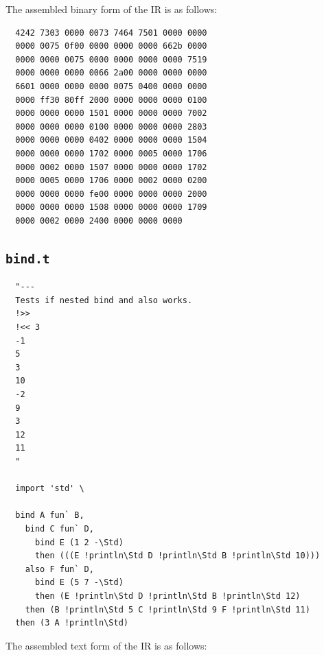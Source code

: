 \documentclass{report}
\begin{document}
The assembled binary form of the IR is as follows:

\begin{mdframed}[style=cl]
\begin{verbatim}
  4242 7303 0000 0073 7464 7501 0000 0000
  0000 0075 0f00 0000 0000 0000 662b 0000
  0000 0000 0075 0000 0000 0000 0000 7519
  0000 0000 0000 0066 2a00 0000 0000 0000
  6601 0000 0000 0000 0075 0400 0000 0000
  0000 ff30 80ff 2000 0000 0000 0000 0100
  0000 0000 0000 1501 0000 0000 0000 7002
  0000 0000 0000 0100 0000 0000 0000 2803
  0000 0000 0000 0402 0000 0000 0000 1504
  0000 0000 0000 1702 0000 0005 0000 1706
  0000 0002 0000 1507 0000 0000 0000 1702
  0000 0005 0000 1706 0000 0002 0000 0200
  0000 0000 0000 fe00 0000 0000 0000 2000
  0000 0000 0000 1508 0000 0000 0000 1709
  0000 0002 0000 2400 0000 0000 0000
\end{verbatim}
\end{mdframed}

\subsection{\texttt{bind.t}}

\begin{mdframed}[style=cl]
\begin{verbatim}
  "---
  Tests if nested bind and also works.
  !>>
  !<< 3
  -1
  5
  3
  10
  -2
  9
  3
  12
  11
  "

  import 'std' \

  bind A fun` B,
    bind C fun` D,
      bind E (1 2 -\Std)
      then (((E !println\Std D !println\Std B !println\Std 10)))
    also F fun` D,
      bind E (5 7 -\Std)
      then (E !println\Std D !println\Std B !println\Std 12)
    then (B !println\Std 5 C !println\Std 9 F !println\Std 11)
  then (3 A !println\Std)
\end{verbatim}
\end{mdframed}

The assembled text form of the IR is as follows:
\end{document}
